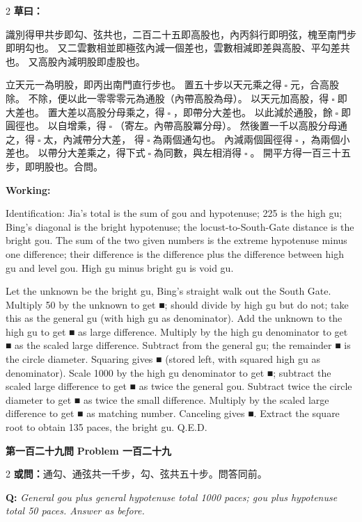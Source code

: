 \documentclass[11pt,a4paper]{article}
\let\origsquare\square
\renewcommand{\square}{\ensuremath{\origsquare}}%
\newcommand{\wen}[1]{%
  \par\vspace{0.5em}%
  \noindent\textcolor{problemcolor}{\textbf{第#1問}}%
  \hfill\textcolor{problemcolor}{\textbf{Problem #1}}\par\nopagebreak%
  \vspace{0.3em}%
}
\newcommand{\owen}[1]{%
  \noindent\textcolor{problemcolor}{\textbf{或問：}}{\tradfont #1}\par\nopagebreak%
}
\newcommand{\oweneng}[1]{%
  \noindent\textcolor{engcolor}{\textbf{Q: }}{\itshape #1}\par\nopagebreak%
}
\newcommand{\tsaoyue}[1]{%
  \noindent\textcolor{workcolor}{\textbf{草曰：}}{\tradfont #1}\par%
}
\newcommand{\tsaoyueeng}[1]{%
  \noindent\textcolor{engcolor}{\textbf{Working: }}{\small #1}\par%
}
\begin{document}
\begin{paracol}{2}
\tsaoyue{%
識別得甲共步即勾、弦共也，二百二十五即高股也，內丙斜行即明弦，槐至南門步即明勾也。
又二雲數相並即極弦內減一個差也，雲數相減即差與高股、平勾差共也。
又高股內減明股即虛股也。

立天元一為明股，即丙出南門直行步也。
置五十步以天元乘之得$ \; \square \; $元，合高股除。
不除，便以此一零零零元為通股（內帶高股為母）。
以天元加高股，得$ \; \square \; $即大差也。
置大差以高股分母乘之，得$ \; \square \; $，即帶分大差也。
以此減於通股，餘$ \; \square \; $即圓徑也。
以自增乘，得$ \; \square \; $（寄左。內帶高股冪分母）。
然後置一千以高股分母通之，得$ \; \square \; $太，內減帶分大差，
得$ \; \square \; $為兩個通勾也。
內減兩個圓徑得$ \; \square \; $，為兩個小差也。
以帶分大差乘之，得下式$ \; \square \; $為同數，與左相消得$ \; \square \; $。
開平方得一百三十五步，即明股也。合問。}
\switchcolumn
\tsaoyueeng{%
Identification: Jia's total is the sum of gou and hypotenuse; 225 is the high gu; Bing's diagonal is the bright hypotenuse; the locust-to-South-Gate distance is the bright gou. The sum of the two given numbers is the extreme hypotenuse minus one difference; their difference is the difference plus the difference between high gu and level gou. High gu minus bright gu is void gu.

Let the unknown be the bright gu, Bing's straight walk out the South Gate. Multiply 50 by the unknown to get ■; should divide by high gu but do not; take this as the general gu (with high gu as denominator). Add the unknown to the high gu to get ■ as large difference. Multiply by the high gu denominator to get ■ as the scaled large difference. Subtract from the general gu; the remainder ■ is the circle diameter. Squaring gives ■ (stored left, with squared high gu as denominator). Scale 1000 by the high gu denominator to get ■; subtract the scaled large difference to get ■ as twice the general gou. Subtract twice the circle diameter to get ■ as twice the small difference. Multiply by the scaled large difference to get ■ as matching number. Canceling gives ■. Extract the square root to obtain 135 paces, the bright gu. Q.E.D.}
\end{paracol}

\vspace{0.5cm}

\wen{一百二十九}

\begin{paracol}{2}
\owen{通勾、通弦共一千步，勾、弦共五十步。問答同前。}
\switchcolumn
\oweneng{General gou plus general hypotenuse total 1000 paces; gou plus hypotenuse total 50 paces. Answer as before.}
\end{paracol}
\end{document}
